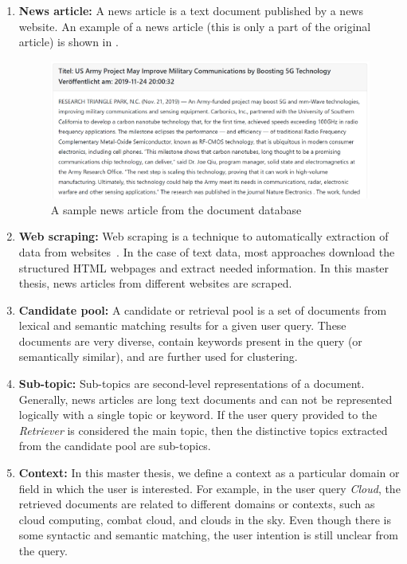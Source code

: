 \documentclass[master,proposal,extern,palatino]{rgseThesis}
\begin{document}
\begin{enumerate}
	
	\item{\textbf{News article:}} A news article is a text document published by a news website.  An example of a news article (this is only a part of the original article) is shown in .
	
	\begin{figure}[h]
		\centering
		\includegraphics[width=.8\textwidth]{images/mitera_screenshots/sample_news_article.PNG}
		\caption{A sample news article from the document database~\cite{sample_news_article}\label{fig:sample_newsarticle}}
	\end{figure} 
	
	
	
	\item{\textbf{Web scraping:}} Web scraping is a technique to automatically extraction of  data from websites~\cite{khder2021web}. In the case of text data, most approaches download the structured HTML webpages and extract needed information. In this master thesis, news articles from different websites are scraped.
	
	\item{\textbf{Candidate pool:}} A candidate or retrieval pool is a set of documents from lexical and
	semantic matching results for a given user query. These documents are very diverse, contain keywords present in the query (or semantically similar), and are further used for
	clustering.
	  
	\item{\textbf{Sub-topic:}} Sub-topics are second-level representations of a document. Generally, news
	articles are long text documents and can not be represented logically with a single
	topic or keyword. If the user query provided to the \textit{Retriever} is considered the main topic, then the distinctive topics extracted from the candidate pool are sub-topics.
	
	\item{\textbf{Context:}} In this master thesis, we define a context as a particular domain or field in which
	the user is interested. For example, in the user query \textit{Cloud}, the retrieved documents are
	related to different domains or contexts, such as cloud computing, combat cloud, and clouds
	in the sky. Even though there is some syntactic and semantic matching, the user intention is still unclear from the query. 	
	

\end{enumerate}
\end{document}
